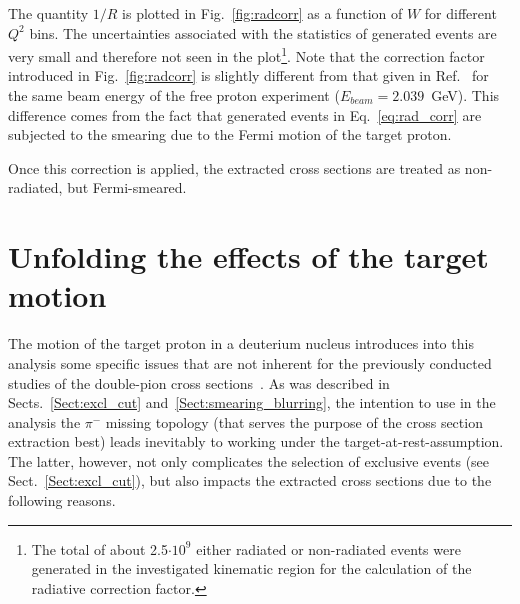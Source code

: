 The quantity $1/R$ is plotted in Fig.~\ref{fig:radcorr} as a function of $W$ for different $Q^{2}$ bins. The uncertainties associated with the statistics of generated events are very small and therefore not seen in the plot\footnote[3]{The total of about 2.5$\cdot 10^{9}$ either radiated or non-radiated events were generated in the investigated kinematic region for the calculation of the radiative correction factor.}. Note that the correction factor introduced in Fig.~\ref{fig:radcorr} is slightly different from that given in Ref.~\cite{Fed_an_note:2017} for the same beam energy of the free proton experiment ($E_{beam} = 2.039$~GeV). This difference comes from the fact that generated events in Eq.~\eqref{eq:rad_corr} are subjected to the smearing due to the Fermi motion of the target proton. 

Once this correction is applied, the extracted cross sections are treated as non-radiated, but Fermi-smeared.


\section{Unfolding the effects of the target motion}
\label{Sect:fermi_corr}


The motion of the target proton in a deuterium nucleus introduces into this analysis some specific issues that are not inherent for the previously conducted studies of the double-pion cross sections~\cite{Rip_an_note:2002,Ripani:2002ss,Fed_an_note:2007,Fedotov:2008aa,Isupov:2017lnd,Arjun,Fed_an_note:2017,Fed_paper_2018}. As was described in Sects.~\ref{Sect:excl_cut} and~\ref{Sect:smearing_blurring}, the intention to use in the analysis the $\pi^{-}$ missing topology (that serves the purpose of the cross section extraction best) leads inevitably to working under the target-at-rest-assumption. The latter, however, not only complicates the selection of exclusive events (see Sect.~\ref{Sect:excl_cut}), but also impacts the extracted cross sections due to the following reasons.

